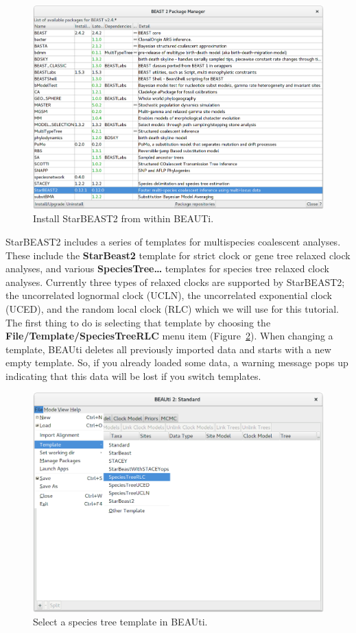 \documentclass{article}
\begin{document}
\begin{figure}[htb!]
\centering
\includegraphics[width=\textwidth]{figures/beauti-install.png}
\caption{Install StarBEAST2 from within BEAUTi.}
\label{fig:managePackages}
\end{figure}

\clearpage

StarBEAST2 includes a series of templates for multispecies coalescent analyses.
These include the \textbf{StarBeast2} template for strict clock or gene tree
relaxed clock analyses, and various \textbf{SpeciesTree\ldots} templates for species tree
relaxed clock analyses. Currently three types of relaxed clocks are supported by
StarBEAST2; the uncorrelated lognormal clock (UCLN), the uncorrelated
exponential clock (UCED), and the random local clock (RLC) which we will use for
this tutorial.  The first thing to do is selecting that template by choosing the
\textbf{File/Template/SpeciesTreeRLC} menu item (Figure~\ref{fig:sb2Template}).
When changing a template, BEAUti deletes all previously imported data and starts
with a new empty template. So, if you already loaded some data, a warning
message pops up indicating that this data will be lost if you switch templates.

\begin{figure}[htb!]
\centering
\includegraphics[width=\textwidth]{figures/beauti-rlc.png}
\caption{Select a species tree template in BEAUti.}
\label{fig:sb2Template}
\end{figure}
\end{document}

